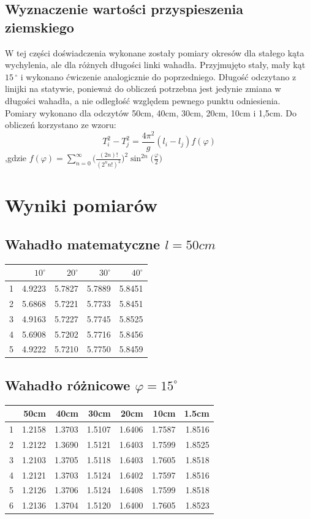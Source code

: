 \documentclass[a4paper,10pt]{article}
\begin{document}
\subsection{Wyznaczenie wartości przyspieszenia ziemskiego}
W tej części doświadczenia wykonane zostały pomiary okresów dla stałego kąta wychylenia, ale dla różnych długości linki wahadła. Przyjmujęto stały, mały kąt $15\,^{\circ}$ i wykonano ćwiczenie analogicznie do poprzedniego. Długość odczytano z linijki na statywie, ponieważ do obliczeń potrzebna jest jedynie zmiana w długości wahadła, a nie odległość względem pewnego punktu odniesienia. Pomiary wykonano dla odczytów 50cm, 40cm, 30cm, 20cm, 10cm i 1,5cm. Do obliczeń korzystano ze wzoru:
\begin{equation}
T_i^2-T_j^2 = \frac{4\pi^2}{g}(l_i-l_j)f(\varphi)
\end{equation}
,gdzie $f(\varphi)=\sum_{n=0}^{\infty}\bigg(\frac{(2n)!}{(2^nn!)^2}\bigg)^2\sin^{2n}\bigg(\frac{\varphi}{2}\bigg)$

\section{Wyniki pomiarów}
\subsection{Wahadło matematyczne $l=50cm$}
\begin{tabular}{lrrrr}
\toprule
{} &    $10^\circ$ &     $20^\circ$ &      $30^\circ$ &      $40^\circ$\\
\midrule
1 &  4.9223 &  5.7827 &  5.7889 &  5.8451 \\
2 &  5.6868 &  5.7221 &  5.7733 &  5.8451 \\
3 &  4.9163 &  5.7227 &  5.7745 &  5.8525 \\
4 &  5.6908 &  5.7202 &  5.7716 &  5.8456 \\
5 &  4.9222 &  5.7210 &  5.7750 &  5.8459 \\
\bottomrule
\end{tabular}
\subsection{Wahadło różnicowe $\varphi = 15^\circ$}
\begin{tabular}{lrrrrrr}
\toprule
{} &      50cm &      40cm &      30cm &      20cm &      10cm &     1.5cm \\
\midrule
1 &  1.2158 &  1.3703 &  1.5107 &  1.6406 &  1.7587 &  1.8516 \\
2 &  1.2122 &  1.3690 &  1.5121 &  1.6403 &  1.7599 &  1.8525 \\
3 &  1.2103 &  1.3705 &  1.5118 &  1.6403 &  1.7605 &  1.8518 \\
4 &  1.2121 &  1.3703 &  1.5124 &  1.6402 &  1.7597 &  1.8516 \\
5 &  1.2126 &  1.3706 &  1.5124 &  1.6408 &  1.7599 &  1.8518 \\
6 &  1.2136 &  1.3704 &  1.5120 &  1.6400 &  1.7605 &  1.8523 \\
\bottomrule
\end{tabular}
\end{document}
